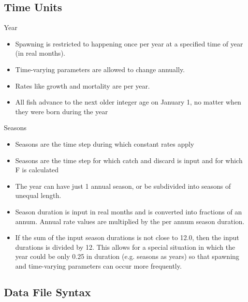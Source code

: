 \subsection{Time Units}
Year
	\begin{itemize}
		\item Spawning is restricted to happening once per year at a specified time of year (in real months).
		\item Time-varying parameters are allowed to change annually.
		\item Rates like growth and mortality are per year.
		\item All fish advance to the next older integer age on January 1, no matter when they were born during the year
	\end{itemize}
Seasons
	 \begin{itemize}
	 	\item Seasons are the time step during which constant rates apply
	 	\item Seasons are the time step for which catch and discard is input and for which F is calculated
	 	\item The year can have just 1 annual season, or be subdivided into seasons of unequal length.
	 	\item Season duration is input in real months and is converted into fractions of an annum.  Annual rate values are multiplied by the per annum season duration.
	 	\item If the sum of the input season durations is not close to 12.0, then the input durations is divided by 12.  This allows for a special situation in which the year could be only 0.25 in duration (e.g. seasons as years) so that spawning and time-varying parameters can occur more frequently.	 	
	 \end{itemize}

\subsection{Data File Syntax}
